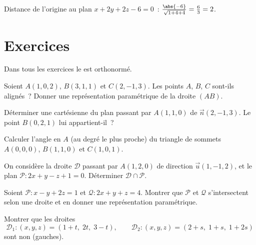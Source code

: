 \begin{example}\label{ex:g12:space:distance}
Distance de l'origine au plan $x + 2y + 2z - 6 = 0$~:
$\frac{\abs{-6}}{\sqrt{1 + 4 + 4}} = \frac63 = 2$.
\end{example}

\section{Exercices}

Dans tous les exercices le  est orthonormé.

\begin{exercise}[$\star$]\label{exo:g12:space:1}
Soient $A(1, 0, 2)$, $B(3, 1, 1)$ et $C(2, -1, 3)$. Les points $A$, $B$,
$C$ sont-ils alignés~? Donner une représentation paramétrique de la droite
$(AB)$.
\end{exercise}

\begin{exercise}[$\star$]\label{exo:g12:space:2}
Déterminer une  cartésienne du plan passant par $A(1, 1, 0)$ de
 $\vec n(2, -1, 3)$. Le point $B(0, 2, 1)$ lui
appartient-il~?
\end{exercise}

\begin{exercise}[$\star$]\label{exo:g12:space:3}
Calculer l'angle en $A$ (au degré le plus proche) du triangle de sommets
$A(0,0,0)$, $B(1, 1, 0)$ et $C(1, 0, 1)$.
\end{exercise}

\begin{exercise}[$\star\star$]\label{exo:g12:space:4}
On considère la droite $\mathcal D$ passant par $A(1, 2, 0)$ de direction
$\vec u(1, -1, 2)$, et le plan $\mathcal P : 2x + y - z + 1 = 0$.
Déterminer $\mathcal D \cap \mathcal P$.
\end{exercise}

\begin{exercise}[$\star\star$]\label{exo:g12:space:5}
Soient $\mathcal P : x - y + 2z = 1$ et $\mathcal Q : 2x + y + z = 4$.
Montrer que $\mathcal P$ et $\mathcal Q$ s'intersectent selon une droite et
en donner une représentation paramétrique.
\end{exercise}

\begin{exercise}[$\star\star$]\label{exo:g12:space:6}
Montrer que les droites
\[
\mathcal D_1 : (x, y, z) = (1 + t,\; 2t,\; 3 - t), \qquad
\mathcal D_2 : (x, y, z) = (2 + s,\; 1 + s,\; 1 + 2s)
\]
sont non  (gauches).
\end{exercise}

